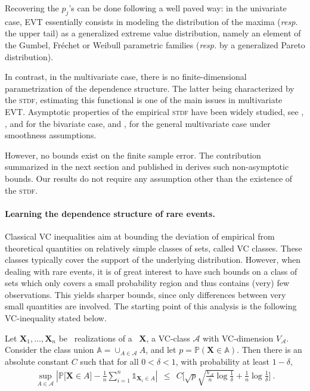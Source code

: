 Recovering the $p_j$'s can be done following a well paved way: in the univariate case, \textsc{EVT} essentially consists in modeling the distribution of the maxima (\emph{resp.} the upper tail) as a generalized extreme value distribution, namely an element of the Gumbel, Fréchet or Weibull parametric families (\emph{resp.} by a generalized Pareto distribution).

In contrast, in the multivariate case, there is no finite-dimensional parametrization of the dependence structure. 
The latter being characterized by the \textsc{stdf}, estimating this functional is one of the main issues in multivariate \textsc{EVT}. Asymptotic properties of the empirical \textsc{stdf} have been widely studied, see \cite{Huangphd}, \cite{Drees98}, \cite{Embrechts2000} and \cite{dHF06} for the bivariate case, and \cite{Qi97}, \cite{Einmahl2012} for the general multivariate case under smoothness assumptions.

However, no bounds exist on the finite sample error. The contribution summarized in the next section and published in \cite{COLT15} derives such non-asymptotic bounds. Our results do not require any assumption other than the existence of the \textsc{stdf}. 




\paragraph{Learning the dependence structure of rare events.}
Classical VC inequalities aim at bounding the deviation of empirical from theoretical quantities on relatively simple classes of sets, called VC classes. These classes typically cover the support of the underlying distribution.  However, when dealing with rare events, it is of great interest to have such bounds on a class of sets which only covers a small probability region and thus contains (very) few observations. This yields sharper bounds, since only differences  between very small quantities are involved. The starting point of this analysis is the following VC-inequality stated below.
\begin{theorem}
\label{thm-princ} 
Let $\mathbf{X}_1,\ldots,\mathbf{X}_n$ be \iid~realizations of a \rv~$\mathbf{X}$, a VC-class $\mathcal{A}$ with VC-dimension $V_{\mathcal{A}}$. %
Consider the class union $\mathbb{A} = \cup_{A \in \mathcal{A}} A$,
 and let  
$p = \mathbb{P}(\mathbf{X} \in \mathbb{A})$. Then there is an absolute constant $C$ such that for all $0<\delta<1$, with probability at least $1-\delta$,
\begin{align*}
\sup_{A \in \mathcal{A}} \left| \mathbb{P} \big[\mathbf{X} \in A\big] - \frac{1}{n} \sum_{i=1}^n \mathds{1}_{\mathbf{X}_i \in A}  \right| ~~\le~~ C \bigg[ \sqrt{p}\sqrt{\frac{V_{\mathcal{A}}}{n} \log{\frac{1}{\delta}}} + \frac{1}{n} \log{\frac{1}{\delta}} \bigg]~.
\end{align*}
\end{theorem}


